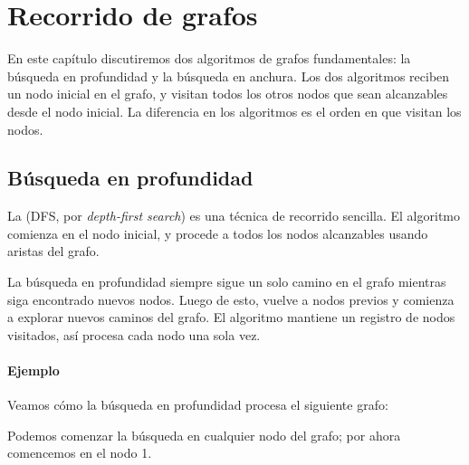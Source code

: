 \chapter{Recorrido de grafos}

En este capítulo discutiremos dos algoritmos de grafos
fundamentales: la búsqueda en profundidad y la búsqueda en anchura.
Los dos algoritmos reciben un nodo inicial en el grafo,
y visitan todos los otros nodos que sean alcanzables desde el
nodo inicial. La diferencia en los algoritmos es el orden
en que visitan los nodos.

\section{Búsqueda en profundidad}


La  (DFS, por \textit{depth-first search})
es una técnica de recorrido sencilla. El algoritmo comienza en el
nodo inicial, y procede a todos los nodos alcanzables usando aristas
del grafo.

La búsqueda en profundidad siempre sigue un solo camino en el grafo
mientras siga encontrado nuevos nodos. Luego de esto, vuelve
a nodos previos y comienza a explorar nuevos caminos del grafo.
El algoritmo mantiene un registro de nodos visitados, así procesa
cada nodo una sola vez.

\subsubsection*{Ejemplo}

Veamos cómo la búsqueda en profundidad procesa
el siguiente grafo:
\begin{center}
\end{center}
Podemos comenzar la búsqueda en cualquier nodo del grafo;
por ahora comencemos en el nodo 1.

